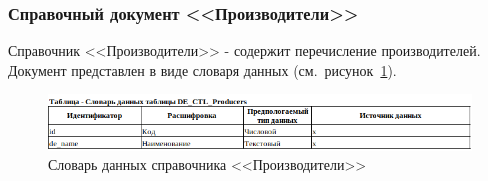 







\subsubsection{Справочный документ <<Производители>>}

Справочник <<Производители>> - содержит перечисление производителей.
Документ представлен в виде словаря данных (см.~рисунок~\ref{fig:InformationalModel_DE_CTL_Producers}).

\begin{figure}[!h]
    \centering
    \includegraphics[width=16cm]
    {assets/InformationalModel/DE_CTL_Producers.png}
    \caption{Словарь данных справочника <<Производители>>}
    \label{fig:InformationalModel_DE_CTL_Producers}
\end{figure}

